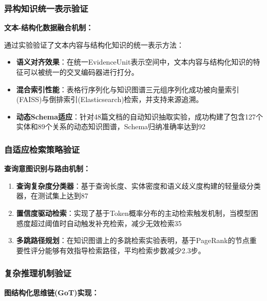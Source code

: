 \subsubsection{异构知识统一表示验证}

\textbf{文本-结构化数据融合机制：}

通过实验验证了文本内容与结构化知识的统一表示方法：

\begin{itemize}
    \item \textbf{语义对齐效果}：在统一EvidenceUnit表示空间中，文本内容与结构化知识的特征可以被统一的交叉编码器进行打分。
    
    \item \textbf{混合索引性能}：表格行序列化与知识图谱三元组序列化成功被向量索引(FAISS\cite{ref32})与倒排索引(Elasticsearch\cite{elasticsearch_guide})检索，并支持来源追溯。
    
    \item \textbf{动态Schema适应}：针对48篇文档的自动知识抽取实验，成功构建了包含127个实体和89个关系的动态知识图谱，Schema归纳准确率达到92%
\end{itemize}

\subsubsection{自适应检索策略验证}

\textbf{查询意图识别与路由机制：}

\begin{enumerate}
    \item \textbf{查询复杂度分类器}：基于查询长度、实体密度和语义歧义度构建的轻量级分类器，在测试集上达到87%
    
    \item \textbf{置信度驱动检索}：实现了基于Token概率分布的主动检索触发机制，当模型困惑度超过阈值时自动触发补充检索，减少无效检索35%
    
    \item \textbf{多跳路径规划}：在知识图谱上的多跳检索实验表明，基于PageRank\cite{pagerank}的节点重要性评分能够有效指导检索路径，平均检索步数减少2.3步。
\end{enumerate}

\subsubsection{复杂推理机制验证}

\textbf{图结构化思维链(GoT)实现：}

